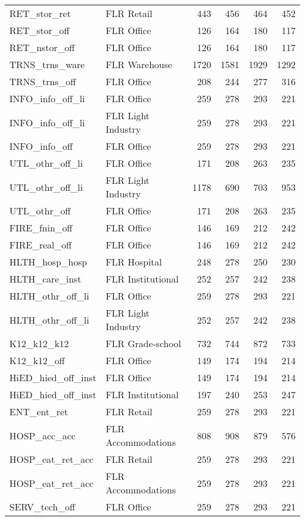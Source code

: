 \begin{small}
\begin{longtable}{llrrrr}
RET\_stor\_ret & FLR Retail & 443 & 456 & 464 & 452 \\
RET\_stor\_off & FLR Office & 126 & 164 & 180 & 117 \\
RET\_nstor\_off & FLR Office & 126 & 164 & 180 & 117 \\
TRNS\_trns\_ware & FLR Warehouse & 1720 & 1581 & 1929 & 1292 \\
TRNS\_trns\_off & FLR Office & 208 & 244 & 277 & 316 \\
INFO\_info\_off\_li & FLR Office & 259 & 278 & 293 & 221 \\
INFO\_info\_off\_li & FLR Light Industry & 259 & 278 & 293 & 221 \\
INFO\_info\_off & FLR Office & 259 & 278 & 293 & 221 \\
UTL\_othr\_off\_li & FLR Office & 171 & 208 & 263 & 235 \\
UTL\_othr\_off\_li & FLR Light Industry & 1178 & 690 & 703 & 953 \\
UTL\_othr\_off & FLR Office & 171 & 208 & 263 & 235 \\
FIRE\_fnin\_off & FLR Office & 146 & 169 & 212 & 242 \\
FIRE\_real\_off & FLR Office & 146 & 169 & 212 & 242 \\
HLTH\_hosp\_hosp & FLR Hospital & 248 & 278 & 250 & 230 \\
HLTH\_care\_inst & FLR Institutional & 252 & 257 & 242 & 238 \\
HLTH\_othr\_off\_li & FLR Office & 259 & 278 & 293 & 221 \\
HLTH\_othr\_off\_li & FLR Light Industry & 252 & 257 & 242 & 238 \\
K12\_k12\_k12 & FLR Grade-school & 732 & 744 & 872 & 733 \\
K12\_k12\_off & FLR Office & 149 & 174 & 194 & 214 \\
HiED\_hied\_off\_inst & FLR Office & 149 & 174 & 194 & 214 \\
HiED\_hied\_off\_inst & FLR Institutional & 197 & 240 & 253 & 247 \\
ENT\_ent\_ret & FLR Retail & 259 & 278 & 293 & 221 \\
HOSP\_acc\_acc & FLR Accommodations & 808 & 908 & 879 & 576 \\
HOSP\_eat\_ret\_acc & FLR Retail & 259 & 278 & 293 & 221 \\
HOSP\_eat\_ret\_acc & FLR Accommodations & 259 & 278 & 293 & 221 \\
SERV\_tech\_off & FLR Office & 259 & 278 & 293 & 221 \\

\end{longtable}
\end{small}
